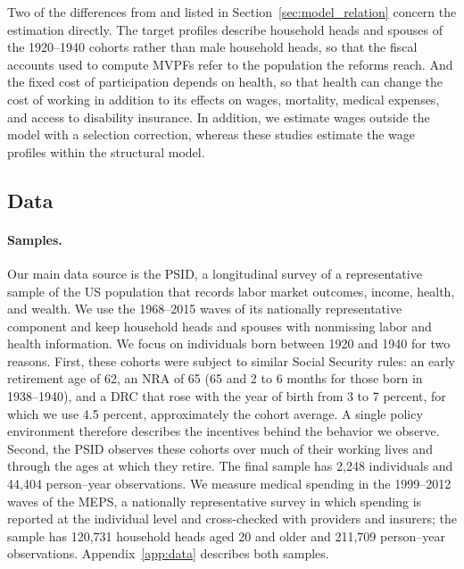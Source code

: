 Two of the differences from \citet{french2005effects} and \citet{french2011effects} listed in Section~\ref{sec:model_relation} concern the estimation directly. The target profiles describe household heads and spouses of the 1920--1940 cohorts rather than male household heads, so that the fiscal accounts used to compute MVPFs refer to the population the reforms reach. And the fixed cost of participation depends on health, so that health can change the cost of working in addition to its effects on wages, mortality, medical expenses, and access to disability insurance. In addition, we estimate wages outside the model with a selection correction, whereas these studies estimate the wage profiles within the structural model.

\subsection{Data}

\paragraph{Samples.} Our main data source is the PSID, a longitudinal survey of a representative sample of the US population that records labor market outcomes, income, health, and wealth. We use the 1968--2015 waves of its nationally representative component and keep household heads and spouses with nonmissing labor and health information. We focus on individuals born between 1920 and 1940 for two reasons. First, these cohorts were subject to similar Social Security rules: an early retirement age of 62, an NRA of 65 (65 and 2 to 6 months for those born in 1938--1940), and a DRC that rose with the year of birth from 3 to 7 percent, for which we use 4.5 percent, approximately the cohort average. A single policy environment therefore describes the incentives behind the behavior we observe. Second, the PSID observes these cohorts over much of their working lives and through the ages at which they retire. The final sample has 2,248 individuals and 44,404 person--year observations. %
We measure medical spending in the 1999--2012 waves of the MEPS, a nationally representative survey in which spending is reported at the individual level and cross-checked with providers and insurers; the sample has 120,731 household heads aged 20 and older and 211,709 person--year observations. %
Appendix~\ref{app:data} describes both samples.

